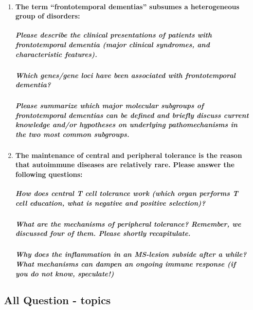 \documentclass[12pt,article,oneside,a4paper]{memoir}
\begin{document}
\begin{enumerate}
\item \paragraph{The term ``frontotemporal dementias'' subsumes a heterogeneous group of disorders:}
\subparagraph{Please describe the clinical presentations of patients with frontotemporal dementia (major clinical syndromes, and characteristic features).}
\subparagraph{Which genes/gene loci have been associated with frontotemporal dementia?}
\subparagraph{Please summarize which major molecular subgroups of frontotemporal dementias can be defined and briefly discuss current knowledge and/or hypotheses on underlying pathomechanisms in the two most common subgroups.}

\item \paragraph{The maintenance of central and peripheral tolerance is the reason that autoimmune diseases are relatively rare. Please answer the following questions:}
\subparagraph{How does central T cell tolerance work (which organ performs T cell education, what is negative and positive selection)?}
\subparagraph{What are the mechanisms of peripheral tolerance? Remember, we discussed four of them. Please shortly recapitulate.}
\subparagraph{Why does the inflammation in an MS-lesion subside after a while? What mechanisms can dampen an ongoing immune response (if you do not know, speculate!)}

\end{enumerate}

\newpage
\subsection{All Question - topics}
\end{document}
